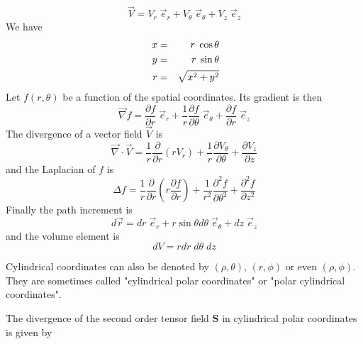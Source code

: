\[
{\vec V} 
= V_r \; \vec{e}_r  + V_\theta \; \vec{e}_\theta + V_z \; \vec{e}_z
\]
We have 
\begin{eqnarray}
x &=& r \; \cos\theta \nn\\
y &=& r \; \sin \theta \nn\\\ 
r &=& \sqrt{x^2+y^2} \nn
\end{eqnarray}
Let $f(r,\theta)$ be a function of the spatial coordinates. Its gradient is then
\[
\vec \nabla f
= \frac{\partial f}{\partial r} \; \vec{e}_r 
+ \frac{1}{r} \frac{\partial f}{\partial \theta} \; \vec{e}_\theta
+ \frac{\partial f}{\partial r} \; \vec{e}_z
\]
The divergence of a vector field $\vec{V}$ is 
\[
\vec\nabla \cdot \vec{V} 
= \frac{1}{r} \frac{\partial }{\partial r} (r V_r) 
+ \frac{1}{r} \frac{\partial V_\theta}{\partial \theta} 
+ \frac{\partial V_z}{\partial z}
\]
and the Laplacian of $f$ is
\[
\Delta f = \frac{1}{r} \frac{\partial }{\partial r} \left( r \frac{\partial f}{\partial r} \right)
+ \frac{1}{r^2} \frac{\partial^2 f}{\partial \theta^2} 
+ \frac{\partial^2 f}{\partial z^2} 
\]
Finally the path increment is
\[
d\vec{r} = dr \; {\vec e}_r  + r \sin\theta d\theta \; {\vec e}_\theta + dz \; \vec{e}_z
\]
and the volume element is 
\[
dV= r dr \; d\theta \; dz
\]

\begin{remark} 
Cylindrical coordinates can also be denoted by $(\rho,\theta)$, $(r,\phi)$ or even $(\rho,\phi)$.
They are sometimes called "cylindrical polar coordinates" or "polar cylindrical coordinates".
\end{remark}


The divergence of the second order tensor field ${\bm S}$ in cylindrical polar coordinates is given 
by


